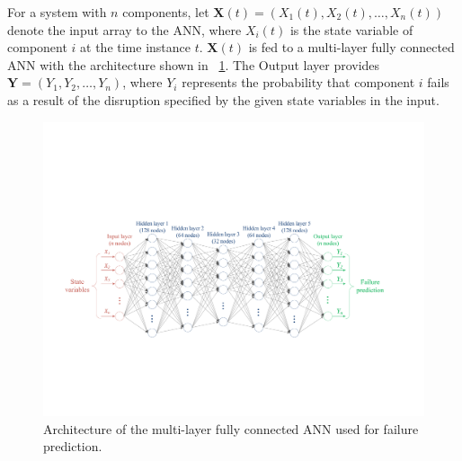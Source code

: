 \documentclass[12pt]{elsarticle}
\begin{document}
For a system with $n$ components, let $\mathbf{X}(t) = \left(X_1(t), X_2(t), \ldots, X_n(t)\right)$ denote the input array to the ANN, where $X_i(t)$ is the state variable of component $i$ at the time instance $t$. $\mathbf{X}(t)$ is fed to a multi-layer fully connected ANN with the architecture shown in \figurename~\ref{nn_architecture}. The Output layer provides $\mathbf{Y} = \left(Y_1, Y_2, \ldots, Y_n\right)$, where $Y_i$ represents the probability that component $i$ fails as a result of the disruption specified by the given state variables in the input.

\begin{figure}
\centering
\includegraphics[width=\columnwidth]{nn_architecture}
\caption{Architecture of the multi-layer fully connected ANN used for failure prediction.}
\label{nn_architecture}
\end{figure}

%
\end{document}
